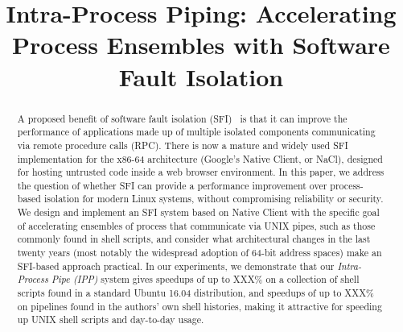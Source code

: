 \documentclass[10pt,preprint,numbers]{sigplanconf}
\title{Intra-Process Piping: Accelerating Process Ensembles with
Software Fault Isolation}
\date{}
\begin{document}
\maketitle

\begin{abstract}

A proposed benefit of software fault isolation (SFI)~\cite{Wahbe:1993}
is that it can improve the performance of applications made up of
multiple isolated components communicating via remote procedure calls
(RPC). There is now a mature and widely used SFI implementation for the
x86-64 architecture (Google's Native Client, or NaCl), designed for
hosting untrusted code inside a web browser environment. In this paper,
we address the question of whether SFI can provide a performance
improvement over process-based isolation for modern Linux systems,
without compromising reliability or security. We design and implement an
SFI system based on Native Client with the specific goal of accelerating
ensembles of process that communicate via UNIX pipes, such as those
commonly found in shell scripts, and consider what architectural changes
in the last twenty years (most notably the widespread adoption of 64-bit
address spaces) make an SFI-based approach practical. In our
experiments, we demonstrate that our \emph{Intra-Process Pipe (IPP)}
system gives speedups of up to XXX\% on a collection of shell scripts
found in a standard Ubuntu 16.04 distribution, and speedups of up to
XXX\% on pipelines found in the authors' own shell histories,
making it attractive for speeding up UNIX shell scripts and day-to-day
usage.

\end{abstract}











\end{document}
